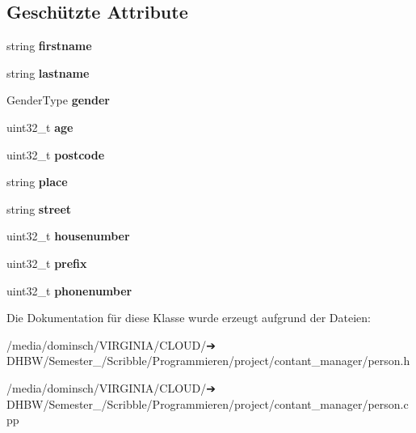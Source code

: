 \subsection*{Geschützte Attribute}
\begin{DoxyCompactItemize}
\item 
\mbox{\label{classContactManager_1_1Person_a9337552bd8f1b26c6d9b73294d524948}} 
string {\bfseries firstname}
\item 
\mbox{\label{classContactManager_1_1Person_ac445e26ae314d647bd8ee1319f709167}} 
string {\bfseries lastname}
\item 
\mbox{\label{classContactManager_1_1Person_a0bd13df83ce9266e7963e8e750e60388}} 
Gender\+Type {\bfseries gender}
\item 
\mbox{\label{classContactManager_1_1Person_a213b6be638a046de34bce8fc8301288c}} 
uint32\+\_\+t {\bfseries age}
\item 
\mbox{\label{classContactManager_1_1Person_a2fd82a38ead08ec16730736327e6ef63}} 
uint32\+\_\+t {\bfseries postcode}
\item 
\mbox{\label{classContactManager_1_1Person_a1714ccedb4e54e6725f7a67b8232dcc0}} 
string {\bfseries place}
\item 
\mbox{\label{classContactManager_1_1Person_aa406cf31ed8b781704ea91aa2efded51}} 
string {\bfseries street}
\item 
\mbox{\label{classContactManager_1_1Person_a8d5ff4192378dbfade263defa5b0198b}} 
uint32\+\_\+t {\bfseries housenumber}
\item 
\mbox{\label{classContactManager_1_1Person_ac50dc517f5877c3fb05aea6a52cc543d}} 
uint32\+\_\+t {\bfseries prefix}
\item 
\mbox{\label{classContactManager_1_1Person_afc600ce59bcb61e62e90db8eeaad398b}} 
uint32\+\_\+t {\bfseries phonenumber}
\end{DoxyCompactItemize}


Die Dokumentation für diese Klasse wurde erzeugt aufgrund der Dateien\+:\begin{DoxyCompactItemize}
\item 
/media/dominsch/\+V\+I\+R\+G\+I\+N\+I\+A/\+C\+L\+O\+U\+D/➔ D\+H\+B\+W/\+Semester\+\_/\+Scribble/\+Programmieren/project/contant\+\_\+manager/person.\+h\item 
/media/dominsch/\+V\+I\+R\+G\+I\+N\+I\+A/\+C\+L\+O\+U\+D/➔ D\+H\+B\+W/\+Semester\+\_/\+Scribble/\+Programmieren/project/contant\+\_\+manager/person.\+cpp\end{DoxyCompactItemize}

